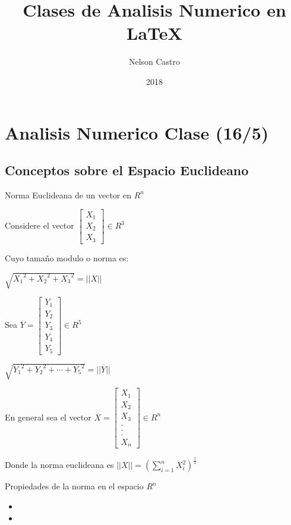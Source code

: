 \documentclass[12pt]{article}
\title{Clases de Analisis Numerico en \LaTeX}
\author{Nelson Castro}
\begin{document}
\date{2018}
\maketitle
\newpage
\section*{Analisis Numerico Clase (16/5)}
\subsection*{Conceptos sobre el Espacio Euclideano}
Norma Euclideana de un vector en {\large $R^n$}
\linebreak

Considere el vector	{\large $\left[
\begin{array}{c}
X_1 \\
X_2\\
X_3 
\end{array}
\right] \in R^3$ } 

Cuyo tamaño modulo o norma es:

{\large $\sqrt{{X_1}^2+{X_2}^2+{X_3}^2}=||\overline{X}||$}

Sea {\large $\overline{Y} = \left[
\begin{array}{c}
Y_1 \\
Y_2\\
Y_3\\
Y_4\\
Y_5 
\end{array}
\right] \in R^5$ }

{\large $\sqrt{{Y_1}^2+{Y_2}^2+ \cdots + {Y_5}^2}=||\overline{Y}||$}

En general sea el vector
{\large $ \overline X = \left[
\begin{array}{c}
X_1 \\
X_2\\
X_3 \\
. \\
. \\
. \\
X_n
\end{array}
\right] \in R^n$ }

Donde la norma euclideana es
{\large $||X||=(\sum_{i=1}^{n}{X_i^2})^\frac{1}{2}$}

Propiedades de la norma en el espacio {\large $R^n$}
\begin{itemize}
\item

\item
\end{itemize}
\end{document}
